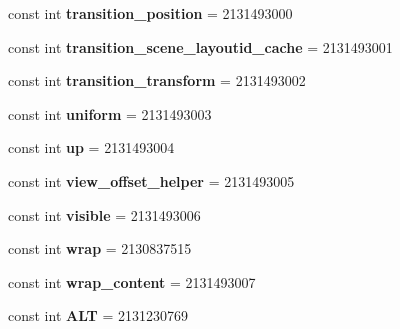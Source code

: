 \begin{DoxyCompactItemize}
const int {\bfseries transition\+\_\+position} = 2131493000
\item 
\mbox{\label{classst_delivery_1_1_resource_1_1_id_a85fc10f506445608cbd18e3e588a6c94}} 
const int {\bfseries transition\+\_\+scene\+\_\+layoutid\+\_\+cache} = 2131493001
\item 
\mbox{\label{classst_delivery_1_1_resource_1_1_id_afb9ae3a037cd5f9b188d420129bc98cc}} 
const int {\bfseries transition\+\_\+transform} = 2131493002
\item 
\mbox{\label{classst_delivery_1_1_resource_1_1_id_a1f0bf1abead7b9c7f1fdb42988a35593}} 
const int {\bfseries uniform} = 2131493003
\item 
\mbox{\label{classst_delivery_1_1_resource_1_1_id_a11dd9bdbefd4216394f3d893f8aad935}} 
const int {\bfseries up} = 2131493004
\item 
\mbox{\label{classst_delivery_1_1_resource_1_1_id_af4ae7910734acce489190ef8f7f813af}} 
const int {\bfseries view\+\_\+offset\+\_\+helper} = 2131493005
\item 
\mbox{\label{classst_delivery_1_1_resource_1_1_id_a0a2922648fb86c178b7578c31ab124fd}} 
const int {\bfseries visible} = 2131493006
\item 
\mbox{\label{classst_delivery_1_1_resource_1_1_id_a0343e7ff3d5028095965dabe50770f6a}} 
const int {\bfseries wrap} = 2130837515
\item 
\mbox{\label{classst_delivery_1_1_resource_1_1_id_a47bc3993fc72f114aefa624c3d966f0e}} 
const int {\bfseries wrap\+\_\+content} = 2131493007
\item 
\mbox{\label{classst_delivery_1_1_resource_1_1_id_adb3d7e917785a169b233763ef1007f3d}} 
const int {\bfseries A\+LT} = 2131230769
\item 
\mbox{\label{classst_delivery_1_1_resource_1_1_id_a488ffd84632d3e3962ddd61d042f75d1}} 

\end{DoxyCompactItemize}
